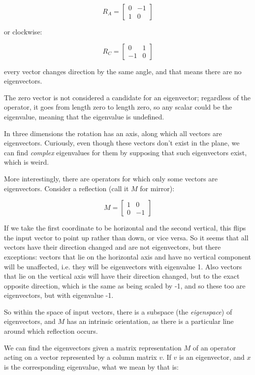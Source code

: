 $$R_A = \begin{bmatrix}0 & -1 \\ 1 & 0\end{bmatrix}$$

or clockwise:

$$R_C = \begin{bmatrix}0 & 1 \\ -1 & 0\end{bmatrix}$$

every vector changes direction by the same angle, and that means there are no eigenvectors.

The zero vector is not considered a candidate for an eigenvector; regardless of the operator, it goes from length zero to length zero, so any scalar could be the eigenvalue, meaning that the eigenvalue is undefined.

In three dimensions the rotation has an axis, along which all vectors are eigenvectors. Curiously, even though these vectors don't exist in the plane, we can find \textit{complex} eigenvalues for them by supposing that such eigenvectors exist, which is weird.

More interestingly, there are operators for which only some vectors are eigenvectors. Consider a reflection (call it $M$ for mirror):

$$M = \begin{bmatrix}1 & 0 \\ 0 & -1\end{bmatrix}$$

If we take the first coordinate to be horizontal and the second vertical, this flips the input vector to point up rather than down, or vice versa. So it seems that all vectors have their direction changed and are not eigenvectors, but there exceptions: vectors that lie on the horizontal axis and have no vertical component will be unaffected, i.e. they will be eigenvectors with eigenvalue 1. Also vectors that lie on the vertical axis will have their direction changed, but to the exact opposite direction, which is the same as being scaled by -1, and so these too are eigenvectors, but with eigenvalue -1.

So within the space of input vectors, there is a subspace (the \textit{eigenspace}) of eigenvectors, and $M$ has an intrinsic orientation, as there is a particular line around which reflection occurs.

We can find the eigenvectors given a matrix representation $M$ of an operator acting on a vector represented by a column matrix $v$. If $v$ is an eigenvector, and $x$ is the corresponding eigenvalue, what we mean by that is:

